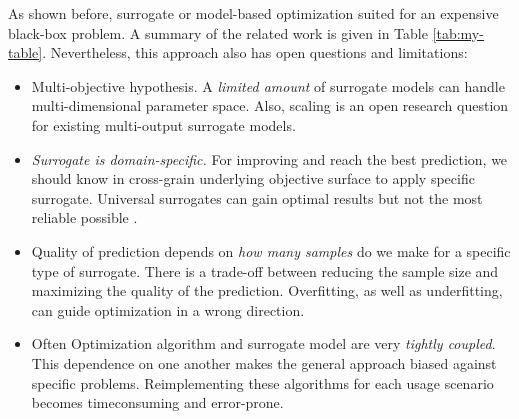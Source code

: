         As shown before, surrogate or model-based optimization suited for an expensive black-box problem. A summary of the related work is given in Table \ref{tab:my-table}.  Nevertheless, this approach also has open questions and limitations:
        \begin{itemize}
            \item Multi-objective hypothesis. A \emph{limited amount} of surrogate models can handle multi-dimensional parameter space. Also, scaling is an open research question for existing multi-output surrogate models.
            \item \emph{Surrogate is domain-specific.} For improving and reach the best prediction, we should know in cross-grain underlying objective surface to apply specific surrogate. Universal surrogates can gain optimal results but not the most reliable possible \cite{abs181207958, LuST19}.
            \item Quality of prediction depends on \emph{how many samples} do we make for a specific type of surrogate. There is a trade-off between reducing the sample size and maximizing the quality of the prediction. Overfitting, as well as underfitting, can guide optimization in a wrong direction.
            \item Often Optimization algorithm and surrogate model are very \emph{tightly coupled}. This dependence on one another makes the general approach biased against specific problems. Reimplementing these algorithms for each usage scenario becomes timeconsuming and error-prone. 
        \end{itemize}

